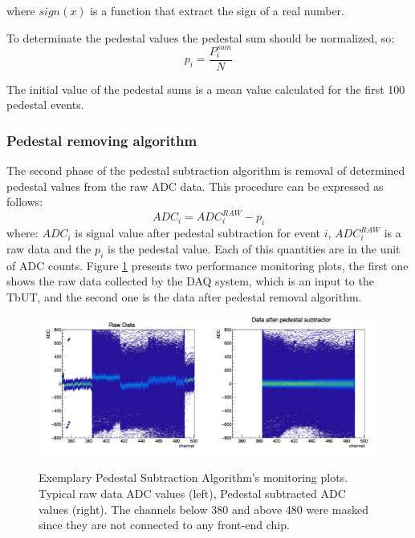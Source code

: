 where $sign(x)$ is a function that extract the sign of a real number. 

To determinate the pedestal values the pedestal sum should be normalized, so:
\begin{equation}
p_{i}=\frac{P^{sum}_{i}}{N}
\end{equation}

The initial value of the pedestal sums is a mean value calculated for the first 100 pedestal events. 

\subsubsection{Pedestal removing algorithm}
The second phase of the pedestal subtraction algorithm is removal of determined pedestal values from the raw ADC data. This procedure can be expressed as follows:
\begin{equation}
ADC_{i}=ADC^{RAW}_{i}-p_{i}
\end{equation} 
where: $ADC_{i}$ is signal value after pedestal subtraction for event $i$, $ADC^{RAW}_{i}$ is a raw data and the $p_{i}$ is the pedestal value. Each of this quantities are in the unit of ADC counts. 
Figure \ref{fig:raw vs ped} presents two performance monitoring plots, the first one shows the raw data collected by the DAQ system, which is an input to the TbUT, and the second one is the data after pedestal removal algorithm.  

\begin{figure}[tbph]
\begin{center}
\includegraphics[width = 0.49\textwidth]{figures/raw_data.png} 
\includegraphics[width = 0.49\textwidth]{figures/pedestal_data.png}
\caption{Exemplary Pedestal Subtraction Algorithm's monitoring plots. Typical raw data ADC values (left), Pedestal subtracted ADC values
(right). The channels below 380 and above 480 were masked since they are not connected to any front-end chip.} 
\label{fig:raw vs ped}
 \end{center}
\end{figure}


